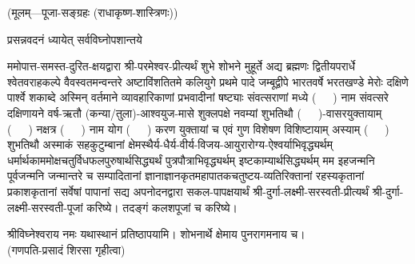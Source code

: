 
\setlength{\parindent}{0pt}
\centerline{\small{(मूलम्—पूजा-सङ्ग्रहः (राधाकृष्ण-शास्त्रिणः))}}


 

{प्रसन्नवदनं ध्यायेत् सर्वविघ्नोपशान्तये}
 

ममोपात्त-समस्त-दुरित-क्षयद्वारा श्री-परमेश्वर-प्रीत्यर्थं शुभे शोभने मुहूर्ते अद्य ब्रह्मणः
द्वितीयपरार्धे श्वेतवराहकल्पे वैवस्वतमन्वन्तरे अष्टाविंशतितमे कलियुगे प्रथमे पादे
जम्बूद्वीपे भारतवर्षे भरतखण्डे मेरोः दक्षिणे पार्श्वे शकाब्दे अस्मिन् वर्तमाने व्यावहारिकाणां प्रभवादीनां षष्ट्याः संवत्सराणां मध्ये \mbox{(~~~)} नाम संवत्सरे दक्षिणायने 
वर्ष-ऋतौ (कन्या/तुला)-आश्वयुज-मासे शुक्लपक्षे नवम्यां शुभतिथौ \mbox{(~~~)}-वासरयुक्तायाम्
\mbox{(~~~)} नक्षत्र \mbox{(~~~)} नाम  योग  \mbox{(~~~)} करण युक्तायां च एवं गुण विशेषण विशिष्टायाम्
अस्याम् \mbox{(~~~)} शुभतिथौ 
अस्माकं सहकुटुम्बानां क्षेमस्थैर्य-धैर्य-वीर्य-विजय-आयुरारोग्य-ऐश्वर्याभिवृद्ध्यर्थम्
 धर्मार्थकाममोक्ष\-चतुर्विधफलपुरुषार्थसिद्ध्यर्थं पुत्रपौत्राभि\-वृद्ध्यर्थम् इष्टकाम्यार्थसिद्ध्यर्थम्
मम इहजन्मनि पूर्वजन्मनि जन्मान्तरे च सम्पादितानां ज्ञानाज्ञानकृतमहा\-पातकचतुष्टय-व्यतिरिक्तानां रहस्यकृतानां प्रकाशकृतानां सर्वेषां पापानां सद्य अपनोदनद्वारा सकल-पापक्षयार्थं 
श्री-दुर्गा-लक्ष्मी-सरस्वती-प्रीत्यर्थं श्री-दुर्गा-लक्ष्मी-सरस्वती-पूजां करिष्ये।
तदङ्गं कलशपूजां च करिष्ये। 


श्रीविघ्नेश्वराय नमः यथास्थानं प्रतिष्ठापयामि। शोभनार्थे क्षेमाय पुनरागमनाय च।\\
(गणपति-प्रसादं शिरसा गृहीत्वा)













\renewcommand{\devAya}{श्री-दुर्गा-लक्ष्मी-युक्तायै सरस्वत्यै नमः,}



